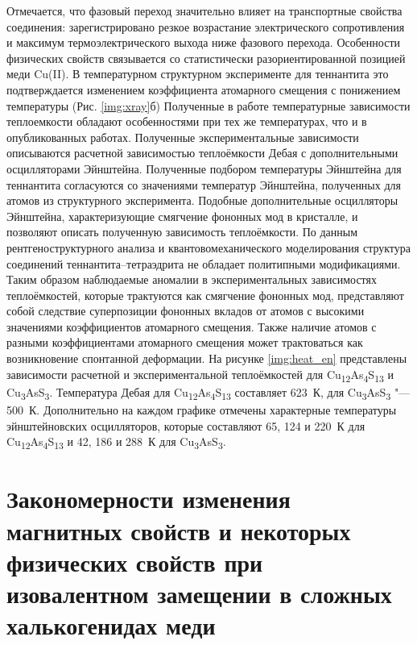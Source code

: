 Отмечается, что фазовый переход значительно влияет на транспортные свойства соединения\cite{Lara-Curzio2014}: зарегистрировано резкое возрастание электрического сопротивления и максимум термоэлектрического выхода ниже фазового перехода. Особенности физических свойств связывается со статистически разориентированной позицией меди Cu(II). В температурном структурном эксперименте для теннантита это подтверждается изменением коэффициента атомарного смещения с понижением температуры (Рис. \ref{img:xray}б)
Полученные в работе температурные  зависимости теплоемкости обладают особенностями при тех же температурах, что и в опубликованных работах. Полученные экспериментальные зависимости описываются расчетной зависимостью теплоёмкости Дебая с дополнительными осцилляторами Эйнштейна. 
Полученные подбором температуры Эйнштейна для теннантита согласуются со значениями температур Эйнштейна, полученных для атомов из структурного эксперимента. 
Подобные дополнительные осцилляторы Эйнштейна, характеризующие смягчение фононных мод в кристалле\cite{bab_81}, и позволяют описать полученную зависимость теплоёмкости. 
По данным рентгеноструктурного анализа и квантовомеханического моделирования структура соединений теннантита--тетраэдрита не обладает политипными модификациями. Таким образом наблюдаемые аномалии в экспериментальных зависимостях теплоёмкостей, которые трактуются как смягчение фононных мод, представляют собой следствие суперпозиции фононных вкладов от атомов с высокими значениями коэффициентов атомарного смещения.
Также наличие атомов с разными коэффициентами атомарного смещения может трактоваться как возникновение спонтанной деформации\cite{bab_1982,bab_81}. 
На рисунке \ref{img:heat_en} представлены зависимости расчетной и экспериментальной теплоёмкостей для  Cu\textsubscript{12}As\textsubscript{4}S\textsubscript{13} и Cu\textsubscript{3}AsS\textsubscript{3}. 
Температура Дебая для Cu\textsubscript{12}As\textsubscript{4}S\textsubscript{13} составляет 623~К, для Cu\textsubscript{3}AsS\textsubscript{3} "--- 500~К. 
Дополнительно на каждом графике отмечены характерные температуры эйнштейновских осцилляторов, которые составляют 65, 124 и 220~К для Cu\textsubscript{12}As\textsubscript{4}S\textsubscript{13} и 42, 186 и 288~К для Cu\textsubscript{3}AsS\textsubscript{3}. 
\clearpage

\newpage

\section{Закономерности изменения магнитных свойств и некоторых физических свойств при изовалентном замещении в сложных халькогенидах меди} \label{sect3_3}

